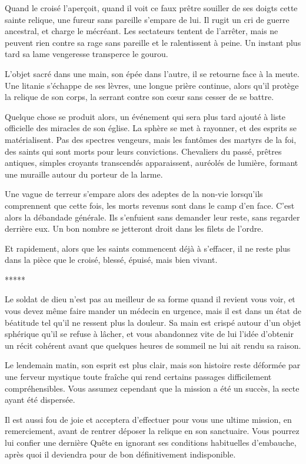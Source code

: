 \documentclass{report}
\newcommand{\ellipse}{
    \begin{center}
        *****
    \end{center}
}
\begin{document}
Quand le croisé l'aperçoit, quand il voit ce faux prêtre souiller de ses doigts cette sainte relique, une fureur sans pareille s'empare de lui. Il rugit un cri de guerre ancestral, et charge le mécréant. Les sectateurs tentent de l'arrêter, mais ne peuvent rien contre sa rage sans pareille et le ralentissent à peine. Un instant plus tard sa lame vengeresse transperce le gourou.

L'objet sacré dans une main, son épée dans l'autre, il se retourne face à la meute. Une litanie s'échappe de ses lèvres, une longue prière continue, alors qu'il protège la relique de son corps, la serrant contre son cœur sans cesser de se battre.

Quelque chose se produit alors, un événement qui sera plus tard ajouté à liste officielle des miracles de son église. La sphère se met à rayonner, et des esprits se matérialisent. Pas des spectres vengeurs, mais les fantômes des martyrs de la foi, des saints qui sont morts pour leurs convictions. Chevaliers du passé, prêtres antiques, simples croyants transcendés apparaissent, auréolés de lumière, formant une muraille autour du porteur de la larme.

Une vague de terreur s'empare alors des adeptes de la non-vie lorsqu'ils comprennent que cette fois, les morts revenus sont dans le camp d'en face. C'est alors la débandade générale. Ils s'enfuient sans demander leur reste, sans regarder derrière eux. Un bon nombre se jetteront droit dans les filets de l'ordre.

Et rapidement, alors que les saints commencent déjà à s'effacer, il ne reste plus dans la pièce que le croisé, blessé, épuisé, mais bien vivant.

\ellipse

Le soldat de dieu n'est pas au meilleur de sa forme quand il revient vous voir, et vous devez même faire mander un médecin en urgence, mais il est dans un état de béatitude tel qu'il ne ressent plus la douleur. Sa main est crispé autour d'un objet sphérique qu'il se refuse à lâcher, et vous abandonnez vite de lui l'idée d'obtenir un récit cohérent avant que quelques heures de sommeil ne lui ait rendu sa raison.

Le lendemain matin, son esprit est plus clair, mais son histoire reste déformée par une ferveur mystique toute fraîche qui rend certains passages difficilement compréhensibles. Vous assumez cependant que la mission a été un succès, la secte ayant été dispersée.

Il est aussi fou de joie et acceptera d'effectuer pour vous une ultime mission, en remerciement, avant de rentrer déposer la relique en son sanctuaire. Vous pourrez lui confier une dernière Quête en ignorant ses conditions habituelles d'embauche, après quoi il deviendra pour de bon définitivement indisponible.
\end{document}

